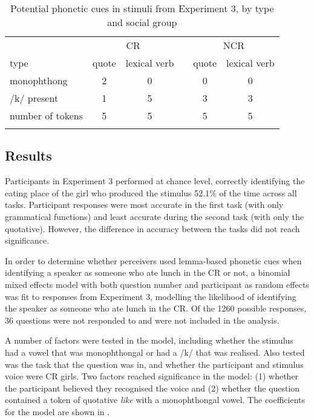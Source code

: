 \begin{table}[ht]
\begin{center}
\begin{tabular}{lccccc}
 \lsptoprule
    
     	 						&	\multicolumn{2}{c}{CR} 		&			& \multicolumn{2}{c}{NCR}\\
\cmidrule{2-3}\cmidrule{5-6}
type						& quote & lexical verb 	& & quote & lexical verb   \\
\midrule
monophthong 		&  2 & 0 &\vline&  0 & 0 \\
/k/ present 		&  1 & 5 &\vline& 3 & 3  \\
number of tokens	& 5 & 5 &\vline&  5 & 5 \\


   \lspbottomrule
   
\end{tabular}
\caption{Potential phonetic cues in stimuli from Experiment 3, by type and social group}\label{tab:cues3}
\end{center}
\end{table}	


  

\subsection{Results}

Participants in Experiment 3 performed at chance level, correctly identifying the eating place of the girl who produced the stimulus 52.1\% of the time across all tasks. Participant responses were most accurate in the first task (with only grammatical functions) and least accurate during the second task (with only the quotative). However, the difference in accuracy between the tasks did not reach significance. 

In order to determine whether perceivers used lemma-based phonetic cues when identifying a speaker as someone who ate lunch in the CR or not, a binomial mixed effects model with both question number and participant as random effects was fit to responses from Experiment 3, modelling the likelihood of identifying the speaker as someone who ate lunch in the CR. Of the 1260 possible responses, 36 questions were not responded to and were not included in the analysis.

A number of factors were tested in the model, including whether the stimulus had a vowel that was monophthongal or had a /k/ that was realised. Also tested was the task that the question was in, and whether the participant and stimulus voice were CR girls. Two factors reached significance in the model: (1) whether the participant believed they recognised the voice and (2) whether the question contained a token of quotative \textit{like} with a monophthongal vowel. The coefficients for the model are shown in . 



